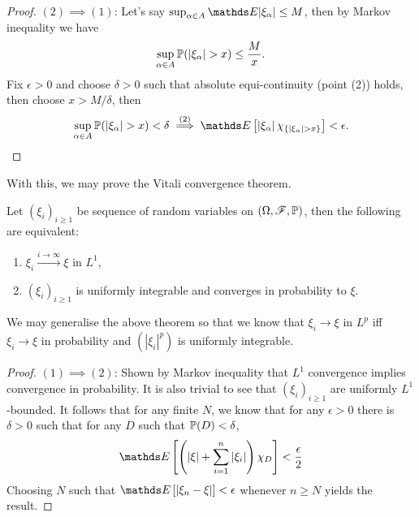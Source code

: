\begin{unexaminable}
\begin{proof}
$(2) \implies (1)$: Let's say $\sup_{\alpha \in A} \E|\xi_\alpha| \leq M$, then by Markov inequality we have
\begin{equation}
    \sup_{\alpha \in A} \mathbb{P}(|\xi_\alpha| > x) \leq \frac{M}{x}.
\end{equation}
Fix $\epsilon > 0$ and choose $\delta > 0$ such that absolute equi-continuity (point (2)) holds, then choose $x > M/\delta$, then 
\begin{equation}
    \sup_{\alpha \in A} \p(|\xi_\alpha| > x) < \delta \overset{(2)}{\implies} \E\sqbracket{\abs{\xi_\alpha} \chi_{\set{|\xi_\alpha|>x}}} < \epsilon.
\end{equation}
\end{proof}

With this, we may prove the Vitali convergence theorem.
\begin{theorem} \label{thm:vitali_convergence}
Let $(\xi_i)_{i\geq 1}$ be sequence of random variables on $(\Omega,\mathcal{F},\mathbb{P})$, then the following are equivalent:
\begin{enumerate}
    \item $\xi_i \overset{i\to\infty}\to \xi$ in $L^1$,
    \item $(\xi_i)_{i\geq 1}$ is uniformly integrable and converges in probability to $\xi$.
\end{enumerate}
\end{theorem}

\begin{remark}
We may generalise the above theorem so that we know that $\xi_i \to \xi$ in $L^p$ iff $\xi_i \to \xi$ in probability and $(|\xi_i|^p)$ is uniformly integrable.
\end{remark}

\begin{proof} 
$(1) \implies (2)$: Shown by Markov inequality that $L^1$ convergence implies convergence in probability. It is also trivial to see that $(\xi_i)_{i\geq 1}$ are uniformly $L^1$-bounded. It follows that for any finite $N$, we know that for any $\epsilon > 0$ there is $\delta > 0$ such that for any $D$ such that $\mathbb{P}(D)<\delta$, 
\begin{equation}
    \E\sqbracket{\bracket{\abs{\xi}+\sum_{i=1}^n \abs{\xi_i}}\chi_D} < \frac{\epsilon}{2}
\end{equation}
Choosing $N$ such that $\E\sqbracket{|\xi_n - \xi|} < \epsilon$ whenever $n \geq N$ yields the result.


\end{proof}
\end{unexaminable}
